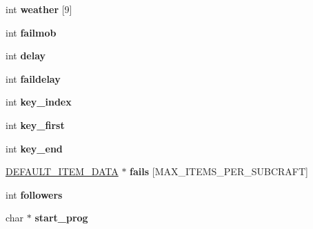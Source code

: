 \begin{DoxyCompactItemize}
\item 
\hypertarget{structsubcraft__head__data_a200cee3cf32033ef96135725305d2a27}{int {\bfseries weather} \mbox{[}9\mbox{]}}\label{structsubcraft__head__data_a200cee3cf32033ef96135725305d2a27}

\item 
\hypertarget{structsubcraft__head__data_aa037711c47b31b5180c90394edc389b3}{int {\bfseries failmob}}\label{structsubcraft__head__data_aa037711c47b31b5180c90394edc389b3}

\item 
\hypertarget{structsubcraft__head__data_a0053e7b4de1ce43002a815e314c18681}{int {\bfseries delay}}\label{structsubcraft__head__data_a0053e7b4de1ce43002a815e314c18681}

\item 
\hypertarget{structsubcraft__head__data_a9abefe55f4b6dffc5db1399b6fcb110c}{int {\bfseries faildelay}}\label{structsubcraft__head__data_a9abefe55f4b6dffc5db1399b6fcb110c}

\item 
\hypertarget{structsubcraft__head__data_a79e3da8c9e0fa47f013a2bafd3ee83da}{int {\bfseries key\-\_\-index}}\label{structsubcraft__head__data_a79e3da8c9e0fa47f013a2bafd3ee83da}

\item 
\hypertarget{structsubcraft__head__data_af7f2b958c290a389d56795129da5b4ef}{int {\bfseries key\-\_\-first}}\label{structsubcraft__head__data_af7f2b958c290a389d56795129da5b4ef}

\item 
\hypertarget{structsubcraft__head__data_a5b9db569412fe92ab19b28a91d2a4479}{int {\bfseries key\-\_\-end}}\label{structsubcraft__head__data_a5b9db569412fe92ab19b28a91d2a4479}

\item 
\hypertarget{structsubcraft__head__data_a3ec0b2d53c443fc93064ffd3877c8bbb}{\hyperlink{structdefault__item__data}{D\-E\-F\-A\-U\-L\-T\-\_\-\-I\-T\-E\-M\-\_\-\-D\-A\-T\-A} $\ast$ {\bfseries fails} \mbox{[}M\-A\-X\-\_\-\-I\-T\-E\-M\-S\-\_\-\-P\-E\-R\-\_\-\-S\-U\-B\-C\-R\-A\-F\-T\mbox{]}}\label{structsubcraft__head__data_a3ec0b2d53c443fc93064ffd3877c8bbb}

\item 
\hypertarget{structsubcraft__head__data_adc6e3156783ca4c4e6b01b3cec6c3e22}{int {\bfseries followers}}\label{structsubcraft__head__data_adc6e3156783ca4c4e6b01b3cec6c3e22}

\item 
\hypertarget{structsubcraft__head__data_a1ce764d4d0b2cac40d916d44407cb3c7}{char $\ast$ {\bfseries start\-\_\-prog}}\label{structsubcraft__head__data_a1ce764d4d0b2cac40d916d44407cb3c7}


\end{DoxyCompactItemize}
